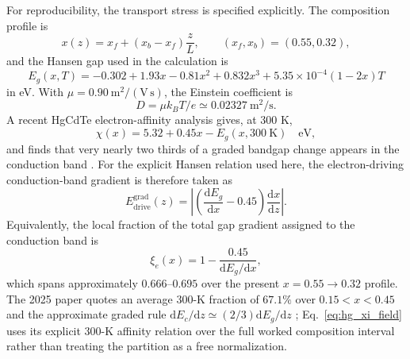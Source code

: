 \documentclass[11pt]{article}
\newcommand{\dd}{\mathrm{d}}
\begin{document}
For reproducibility, the transport stress is specified explicitly. The composition profile is
\begin{equation}
x(z)=x_f+(x_b-x_f)\frac{z}{L},\qquad (x_f,x_b)=(0.55,0.32),
\end{equation}
and the Hansen gap used in the calculation is
\begin{equation}
\boxed{E_g(x,T)=-0.302+1.93x-0.81x^2+0.832x^3+5.35\times10^{-4}(1-2x)T}
\label{eq:hansen_explicit}
\end{equation}
in eV. With $\mu=0.90~\mathrm{m^2/(V\,s)}$, the Einstein coefficient is
\begin{equation}
D=\mu k_BT/e\simeq0.02327~\mathrm{m^2/s}.
\end{equation}
A recent HgCdTe electron-affinity analysis gives, at 300 K,
\begin{equation}
\boxed{\chi(x)=5.32+0.45x-E_g(x,300~\mathrm K)\quad \mathrm{eV},}
\label{eq:hg_affinity}
\end{equation}
and finds that very nearly two thirds of a graded bandgap change appears in the conduction band \cite{RhigerMustafa2025}. For the explicit Hansen relation used here, the electron-driving conduction-band gradient is therefore taken as
\begin{equation}
\boxed{E_{\mathrm{drive}}^{\mathrm{grad}}(z)=\left|\left(\frac{\dd E_g}{\dd x}-0.45\right)\frac{\dd x}{\dd z}\right|.}
\label{eq:hg_xi_field}
\end{equation}
Equivalently, the local fraction of the total gap gradient assigned to the conduction band is
\begin{equation}
\xi_e(x)=1-\frac{0.45}{\dd E_g/\dd x},
\end{equation}
which spans approximately $0.666$--$0.695$ over the present $x=0.55\rightarrow0.32$ profile. The 2025 paper quotes an average 300-K fraction of $67.1\%$ over $0.15<x<0.45$ and the approximate graded rule $\dd E_c/\dd z\simeq(2/3)\dd E_g/\dd z$ \cite{RhigerMustafa2025}; Eq.~\eqref{eq:hg_xi_field} uses its explicit 300-K affinity relation over the full worked composition interval rather than treating the partition as a free normalization.
\end{document}
